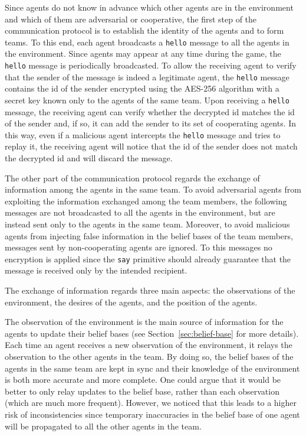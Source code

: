 Since agents do not know in advance which other agents are in the environment and which of them are adversarial or cooperative, the first step of the communication protocol is to establish the identity of the agents and to form teams. To this end, each agent broadcasts a \texttt{hello} message to all the agents in the environment. Since agents may appear at any time during the game, the \texttt{hello} message is periodically broadcasted. To allow the receiving agent to verify that the sender of the message is indeed a legitimate agent, the \texttt{hello} message contains the id of the sender encrypted using the AES-256 algorithm with a secret key known only to the agents of the same team. Upon receiving a \texttt{hello} message, the receiving agent can verify whether the decrypted id matches the id of the sender and, if so, it can add the sender to its set of cooperating agents. In this way, even if a malicious agent intercepts the \texttt{hello} message and tries to replay it, the receiving agent will notice that the id of the sender does not match the decrypted id and will discard the message.

The other part of the communication protocol regards the exchange of information among the agents in the same team. To avoid adversarial agents from exploiting the information exchanged among the team members, the following messages are not broadcasted to all the agents in the environment, but are instead sent only to the agents in the same team. Moreover, to avoid malicious agents from injecting false information in the belief bases of the team members, messages sent by non-cooperating agents are ignored. To this messages no encryption is applied since the \texttt{say} primitive should already guarantee that the message is received only by the intended recipient.

The exchange of information regards three main aspects: the observations of the environment, the desires of the agents, and the position of the agents.

The observation of the environment is the main source of information for the agents to update their belief bases (see Section~\ref{sec:belief-base} for more details). Each time an agent receives a new observation of the environment, it relays the observation to the other agents in the team. By doing so, the belief bases of the agents in the same team are kept in sync and their knowledge of the environment is both more accurate and more complete. One could argue that it would be better to only relay updates to the belief base, rather than each observation (which are much more frequent). However, we noticed that this leads to a higher risk of inconsistencies since temporary inaccuracies in the belief base of one agent will be propagated to all the other agents in the team.

